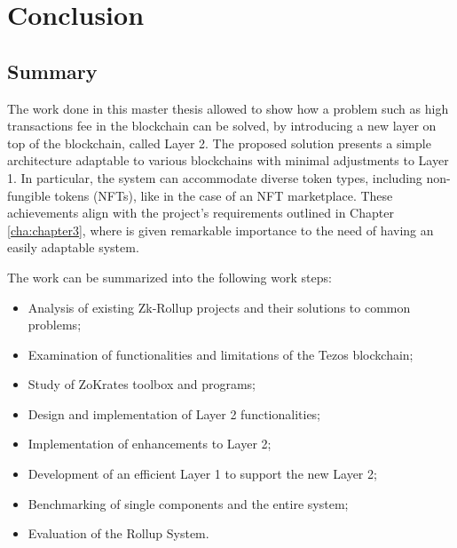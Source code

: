\chapter{Conclusion\label{cha:chapter7}}

\section{Summary\label{sec:summary}}

The work done in this master thesis allowed to show how a problem such as high transactions fee in the blockchain can be solved, by introducing a new layer on top of the blockchain, called Layer 2. The proposed solution presents a simple architecture adaptable to various blockchains with minimal adjustments to Layer 1. In particular, the system can accommodate diverse token types, including non-fungible tokens (NFTs), like in the case of an NFT marketplace. These achievements align with the project's requirements outlined in Chapter \ref{cha:chapter3}, where is given remarkable importance to the need of having an easily adaptable system.

\noindent The work can be summarized into the following work steps:
\vspace{-0.11in}
\begin{itemize}
	\item Analysis of existing Zk-Rollup projects and their solutions to common problems;
	      \vspace{-0.11in}
	\item Examination of functionalities and limitations of the Tezos blockchain;
	      \vspace{-0.11in}
	\item Study of ZoKrates toolbox and programs;
	      \vspace{-0.11in}
	\item Design and implementation of Layer 2 functionalities;
	      \vspace{-0.11in}
	\item Implementation of enhancements to Layer 2;
	      \vspace{-0.11in}
	\item Development of an efficient Layer 1 to support the new Layer 2;
	      \vspace{-0.11in}
	\item Benchmarking of single components and the entire system;
	      \vspace{-0.11in}
	\item Evaluation of the Rollup System.
\end{itemize}

